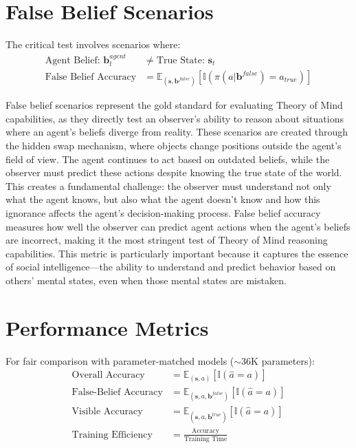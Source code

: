 \documentclass[11pt]{article}
\begin{document}
\section{False Belief Scenarios}

The critical test involves scenarios where:
\begin{align}
    \text{Agent Belief: } \mathbf{b}_t^{agent} &\neq \text{True State: } \mathbf{s}_t \\
    \text{False Belief Accuracy} &= \mathbb{E}_{(\mathbf{s}, \mathbf{b}^{false})} [\mathbb{I}(\pi(a | \mathbf{b}^{false}) = a_{true})]
\end{align}

False belief scenarios represent the gold standard for evaluating Theory of Mind capabilities, as they directly test an observer's ability to reason about situations where an agent's beliefs diverge from reality. These scenarios are created through the hidden swap mechanism, where objects change positions outside the agent's field of view. The agent continues to act based on outdated beliefs, while the observer must predict these actions despite knowing the true state of the world. This creates a fundamental challenge: the observer must understand not only what the agent knows, but also what the agent doesn't know and how this ignorance affects the agent's decision-making process. False belief accuracy measures how well the observer can predict agent actions when the agent's beliefs are incorrect, making it the most stringent test of Theory of Mind reasoning capabilities. This metric is particularly important because it captures the essence of social intelligence—the ability to understand and predict behavior based on others' mental states, even when those mental states are mistaken.

\section{Performance Metrics}

For fair comparison with parameter-matched models ($\sim$36K parameters):
\begin{align}
    \text{Overall Accuracy} &= \mathbb{E}_{(\mathbf{s}, a)} [\mathbb{I}(\hat{a} = a)] \\
    \text{False-Belief Accuracy} &= \mathbb{E}_{(\mathbf{s}, a, \mathbf{b}^{false})} [\mathbb{I}(\hat{a} = a)] \\
    \text{Visible Accuracy} &= \mathbb{E}_{(\mathbf{s}, a, \mathbf{b}^{true})} [\mathbb{I}(\hat{a} = a)] \\
    \text{Training Efficiency} &= \frac{\text{Accuracy}}{\text{Training Time}}
\end{align}
\end{document}
